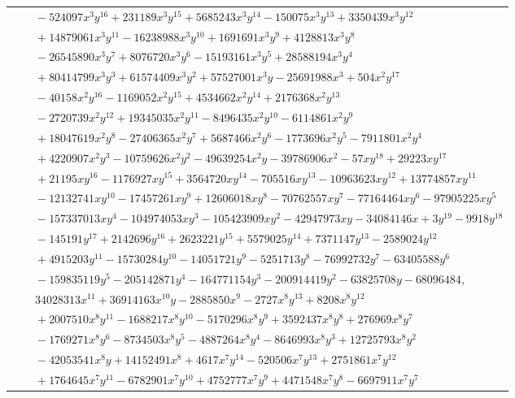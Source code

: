 \documentclass[11pt]{article}
\begin{document}
\begin{longtable}{@{}ll@{}}
 & $\quad -524097x^{3}y^{16}+231189x^{3}y^{15}+5685243x^{3}y^{14}-150075x^{3}y^{13}+3350439x^{3}y^{12}$\\
 & $\quad +14879061x^{3}y^{11}-16238988x^{3}y^{10}+1691691x^{3}y^{9}+4128813x^{3}y^{8}$\\
 & $\quad -26545890x^{3}y^{7}+8076720x^{3}y^{6}-15193161x^{3}y^{5}+28588194x^{3}y^{4}$\\
 & $\quad +80414799x^{3}y^{3}+61574409x^{3}y^{2}+57527001x^{3}y-25691988x^{3}+504x^{2}y^{17}$\\
 & $\quad -40158x^{2}y^{16}-1169052x^{2}y^{15}+4534662x^{2}y^{14}+2176368x^{2}y^{13}$\\
 & $\quad -2720739x^{2}y^{12}+19345035x^{2}y^{11}-8496435x^{2}y^{10}-6114861x^{2}y^{9}$\\
 & $\quad +18047619x^{2}y^{8}-27406365x^{2}y^{7}+5687466x^{2}y^{6}-1773696x^{2}y^{5}-7911801x^{2}y^{4}$\\
 & $\quad +4220907x^{2}y^{3}-10759626x^{2}y^{2}-49639254x^{2}y-39786906x^{2}-57xy^{18}+29223xy^{17}$\\
 & $\quad +21195xy^{16}-1176927xy^{15}+3564720xy^{14}-705516xy^{13}-10963623xy^{12}+13774857xy^{11}$\\
 & $\quad -12132741xy^{10}-17457261xy^{9}+12606018xy^{8}-70762557xy^{7}-77164464xy^{6}-97905225xy^{5}$\\
 & $\quad -157337013xy^{4}-104974053xy^{3}-105423909xy^{2}-42947973xy-34084146x+3y^{19}-9918y^{18}$\\
 & $\quad -145191y^{17}+2142696y^{16}+2623221y^{15}+5579025y^{14}+7371147y^{13}-2589024y^{12}$\\
 & $\quad +4915203y^{11}-15730284y^{10}-14051721y^{9}-5251713y^{8}-76992732y^{7}-63405588y^{6}$\\
 & $\quad -159835119y^{5}-205142871y^{4}-164771154y^{3}-200914419y^{2}-63825708y-68096484,$\\
 & $\quad 34028313x^{11}+36914163x^{10}y-2885850x^{9}-2727x^{8}y^{13}+8208x^{8}y^{12}$\\
 & $\quad +2007510x^{8}y^{11}-1688217x^{8}y^{10}-5170296x^{8}y^{9}+3592437x^{8}y^{8}+276969x^{8}y^{7}$\\
 & $\quad -1769271x^{8}y^{6}-8734503x^{8}y^{5}-4887264x^{8}y^{4}-8646993x^{8}y^{3}+12725793x^{8}y^{2}$\\
 & $\quad -42053541x^{8}y+14152491x^{8}+4617x^{7}y^{14}-520506x^{7}y^{13}+2751861x^{7}y^{12}$\\
 & $\quad +1764645x^{7}y^{11}-6782901x^{7}y^{10}+4752777x^{7}y^{9}+4471548x^{7}y^{8}-6697911x^{7}y^{7}$\\

\end{longtable}
\end{document}
